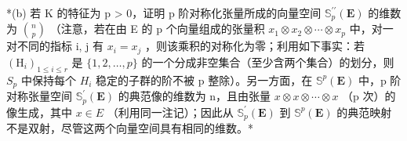 *(b) 若 K 的特征为 p \textgreater{} 0，证明 p 阶对称化张量所成的向量空间 \(\mathbb{S}_{p}^{\prime\prime}(\mathbf{E})\) 的维数为 \(\binom{n}{p}\) （注意，若在由 E 的 p 个向量组成的张量积 \(x_{1} \otimes x_{2} \otimes \cdots \otimes x_{p}\) 中，对一对不同的指标 i, j 有 \(x_{i} = x_{j}\) ，则该乘积的对称化为零；利用如下事实：若 \((\mathrm{H}_{i})_{1 \leqslant i \leqslant r}\) 是 \(\{1, 2, \ldots, p\}\) 的一个分成非空集合（至少含两个集合）的划分，则 \(S_{p}\) 中保持每个 \(H_{i}\) 稳定的子群的阶不被 p 整除）。另一方面，在 \(\mathbb{S}^{p}(\mathbf{E})\) 中，p 阶对称张量空间 \(\mathbb{S}_{p}^{\prime}(\mathbf{E})\) 的典范像的维数为 n，且由张量 \(x \otimes x \otimes \cdots \otimes x\) （p 次）的像生成，其中 \(x \in E\) （利用同一注记）；因此从 \(\mathbb{S}_{p}^{\prime}(\mathbf{E})\) 到 \(\mathbb{S}^{p}(\mathbf{E})\) 的典范映射不是双射，尽管这两个向量空间具有相同的维数。*

